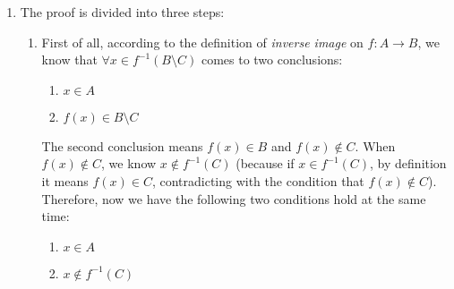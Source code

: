\documentclass[12pt, letterpaper, oneside]{book}
\begin{document}
\begin{enumerate}
\begin{enumerate}
{                  intersection} again, we know this means $x \in f^{-1}(C) \cap
                  f^{-1}(D)$. Therefore, the whole reasoning chain can be summarized as
                $\forall x \in f^{-1}(C \cap D) \Rightarrow x \in f^{-1}(C) \cap
                  f^{-1}(D)$. According to the definition of \textit{subset}, this means
                $f^{-1}(C \cap D) \subset f^{-1}(C) \cap f^{-1}(D)$.
          \item $\forall x \in f^{-1}(C) \cap f^{-1}(D)$ means $x \in f^{-1}(C)$ and
                $x \in f^{-1}(D)$ which means $f(x) \in C$ and $f(x) \in D$ which means
                $f(x) \in C \cap D$. According to the definition of \textit{inverse
                  image}, this means $x \in f^{-1}(C \cap D)$. Therefore, the whole
                reasoning chain can be summarized as $\forall x \in f^{-1}(C) \cap
                  f^{-1}(D) \Rightarrow x \in f^{-1}(C \cap D)$. According to the
                definition of \textit{subset}, this means $f^{-1}(C) \cap f^{-1}(D)
                  \subset f^{-1}(C \cap D)$.
          \item According to the definition of \textit{equal}, we know $f^{-1}(C
                  \cap D)$ = $f^{-1}(C) \cap f^{-1}(D)$.
        \end{enumerate}
  \item The proof is divided into three steps:
        \begin{enumerate}
          \item First of all, according to the definition of \textit{inverse image}
                on $f: A \rightarrow B$, we know that $\forall x \in f^{-1}(B \setminus
                  C)$ comes to two conclusions:
                \begin{enumerate}
                  \item $x \in A$
                  \item $f(x) \in B \setminus C$
                \end{enumerate}
                The second conclusion means $f(x) \in B$ and $f(x) \notin C$. When $f(x)
                  \notin C$, we know $x \notin f^{-1}(C)$ (because if $x \in f^{-1}(C)$,
                by definition it means $f(x) \in C$, contradicting with the condition
                that $f(x) \notin C$). Therefore, now we have the following two
                conditions hold at the same time:
                \begin{enumerate}
                  \item $x \in A$
                  \item $x \notin f^{-1}(C)$

\end{enumerate}
\end{enumerate}
\end{enumerate}
\end{document}
